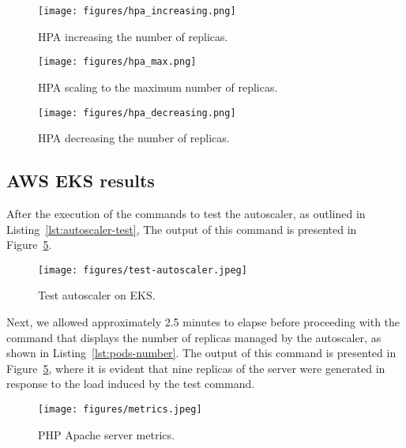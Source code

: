 \begin{figure}[!htbp]
  \centering
  \texttt{[image: figures/hpa\_increasing.png]}
  \caption{HPA increasing the number of replicas.}
  \label{fig:hpa_increasing}
\end{figure}

\begin{figure}[!htbp]
  \centering
  \texttt{[image: figures/hpa\_max.png]}
  \caption{HPA scaling to the maximum number of replicas.}
  \label{fig:hpa_max}
\end{figure}

\begin{figure}[!htbp]
  \centering
  \texttt{[image: figures/hpa\_decreasing.png]}
  \caption{HPA decreasing the number of replicas.}
  \label{fig:hpa_decreasing}
\end{figure}


\subsection{AWS EKS results}

After the execution of the commands to test the autoscaler, as outlined in Listing~\ref{lst:autoscaler-test}, The output of this command is presented in Figure~\ref{fig:metrics}.

\begin{figure}[!htbp]
  \centering
  \texttt{[image: figures/test-autoscaler.jpeg]}
  \caption{Test autoscaler on EKS.}
  \label{fig:test-autoscaler}
\end{figure}

Next, we allowed approximately 2.5 minutes to elapse before proceeding with the command that displays the number of replicas managed by the autoscaler, as shown in Listing~\ref{lst:pods-number}. The output of this command is presented in Figure~\ref{fig:metrics}, where it is evident that nine replicas of the server were generated in response to the load induced by the test command.

\begin{figure}[!htbp]
  \centering
  \texttt{[image: figures/metrics.jpeg]}
  \caption{PHP Apache server metrics.}
  \label{fig:metrics}
\end{figure}
